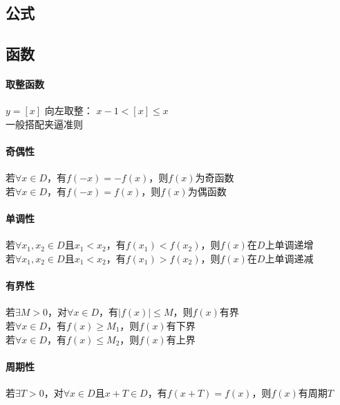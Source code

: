 \documentclass{article}
\begin{document}
\begin{flushleft}
	\LARGE
	
	\section{公式}
	
	\subsection{函数}
	
	\paragraph{取整函数}
	$y=[x]$ 向左取整： $x-1<[x]\leq x$\\
	一般搭配夹逼准则\\
	
	\paragraph{奇偶性}
	若$\forall x\in D$，有$f(-x)=-f(x)$，则$f(x)$为奇函数\\
	若$\forall x\in D$，有$f(-x)=f(x)$，则$f(x)$为偶函数\\
	
	\paragraph{单调性}
	若$\forall x_1,x_2\in D$且$x_1<x_2$，有$f(x_1)<f(x_2)$，则$f(x)$在$D$上单调递增\\
	若$\forall x_1,x_2\in D$且$x_1<x_2$，有$f(x_1)>f(x_2)$，则$f(x)$在$D$上单调递减\\
	
	\paragraph{有界性}
	若$\exists M>0$，对$\forall x\in D$，有$|f(x)|\le M$，则$f(x)$有界\\
	\qquad 若$\forall x\in D$，有$f(x)\ge M_1$，则$f(x)$有下界\\
	\qquad 若$\forall x\in D$，有$f(x)\le M_2$，则$f(x)$有上界\\
	
	\paragraph{周期性}
	若$\exists T>0$，对$\forall x\in D$且$x+T\in D$，有$f(x+T)=f(x)$，则$f(x)$有周期$T$\\
	

\end{flushleft}
\end{document}
